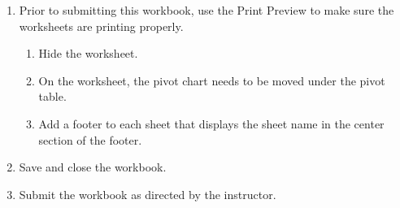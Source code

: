 \begin{enumerate}[resume]
	\item Prior to submitting this workbook, use the Print Preview to make sure the worksheets are printing properly.
	
	\begin{enumerate}
		\item Hide the  worksheet.
		\item On the  worksheet, the pivot chart needs to be moved under the pivot table.
		\item Add a footer to each sheet that displays the sheet name in the center section of the footer.
	\end{enumerate}

	\item Save and close the  workbook.
	\item Submit the  workbook as directed by the instructor.
\end{enumerate}